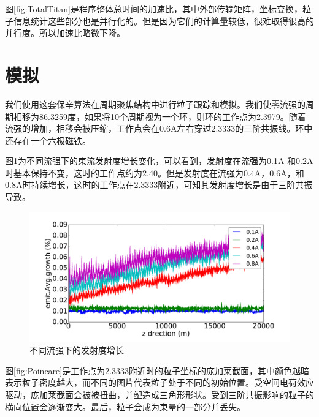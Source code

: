 图\ref{fig:TotalTitan}是程序整体总时间的加速比，其中外部传输矩阵，坐标变换，粒子信息统计这些部分也是并行化的。但是因为它们的计算量较低，很难取得很高的并行度。所以加速比略微下降。
\section{模拟}                \label{section:simulation}
我们使用这套保辛算法在周期聚焦结构中进行粒子跟踪和模拟。我们使零流强的周期相移为86.3259度，如果将10个周期视为一个环，则环的工作点为2.3979。随着流强的增加，相移会被压缩，工作点会在0.6A左右穿过2.3333的三阶共振线。环中还存在一个六极磁铁。

图\ref{fig:emitGrowthCompare}为不同流强下的束流发射度增长变化，可以看到，发射度在流强为0.1A 和0.2A 时基本保持不变，这时的工作点约为2.40。但是发射度在流强为0.4A，0.6A，和0.8A时持续增长，这时的工作点在2.3333附近，可知其发射度增长是由于三阶共振导致。

\begin{figure}[!htb]
    \centering
    \includegraphics[width=\textwidth]{plot/emitGrowthCompare.pdf}
    \caption{不同流强下的发射度增长}
    \label{fig:emitGrowthCompare}
\end{figure}

图\ref{fig:Poincare}是工作点为2.3333附近时的粒子坐标的庞加莱截面，其中颜色越暗表示粒子密度越大，而不同的图片代表粒子处于不同的初始位置。受空间电荷效应驱动，庞加莱截面会被被扭曲，并塑造成三角形形状。受到三阶共振影响的粒子的横向位置会逐渐变大。最后，粒子会成为束晕的一部分并丢失。

